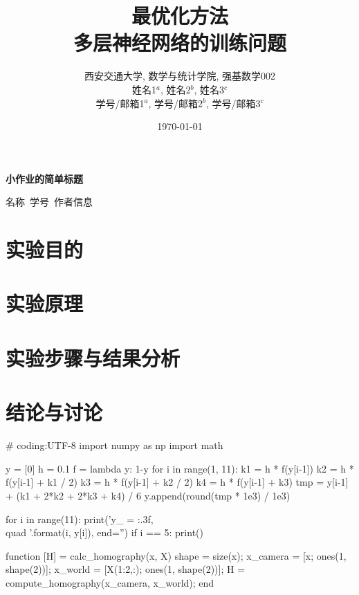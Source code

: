 \documentclass[12pt, a4paper, oneside]{ctexart}
\numberwithin{equation}{section}  %
\newenvironment{myTitle}[1]{
    \begin{center}
    {\zihao{-2}\bf #1\\}
    \zihao{-4}\it
}{\end{center}}  %
\begin{document}
\title{最优化方法\\多层神经网络的训练问题}
\author{
西安交通大学, 数学与统计学院, 强基数学002\\[1ex]
姓名1$^a$, 姓名2$^b$, 姓名3$^c$\\[1ex]
学号/邮箱1$^a$, 学号/邮箱2$^b$, 学号/邮箱3$^c$
}
\date{\today}
\maketitle %
\clearpage %
\tableofcontents %

\clearpage
\begin{myTitle}{小作业的简单标题}
    名称\ 学号\ 作者信息
\end{myTitle}
\section{实验目的}
\section{实验原理}
\section{实验步骤与结果分析}
\section{结论与讨论}

\begin{pythoncode}
# coding:UTF-8
import numpy as np
import math

y = [0]
h = 0.1
f = lambda y: 1-y
for i in range(1, 11):
    k1 = h * f(y[i-1])
    k2 = h * f(y[i-1] + k1 / 2)
    k3 = h * f(y[i-1] + k2 / 2)
    k4 = h * f(y[i-1] + k3)
    tmp = y[i-1] + (k1 + 2*k2 + 2*k3 + k4) / 6
    y.append(round(tmp * 1e3) / 1e3)

for i in range(11):
    print('y_{{{}}} = {:.3f},\\quad '.format(i, y[i]), end='')
    if i == 5:
        print()
\end{pythoncode}
\begin{matlabcode}
function [H] = calc_homography(x, X)
    shape = size(x);
    x_camera = [x; ones(1, shape(2))];
    x_world = [X(1:2,:); ones(1, shape(2))];
    H = compute_homography(x_camera, x_world);
end
\end{matlabcode}
\end{document}

